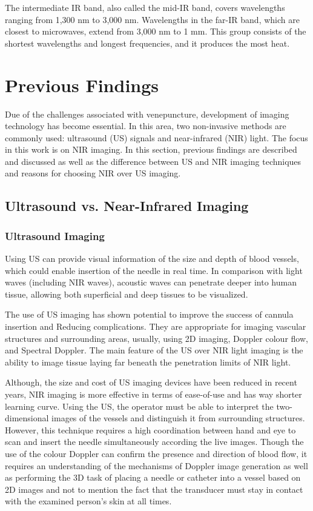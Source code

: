 The intermediate IR band, also called the mid-IR band, covers wavelengths ranging from 1,300 nm to 3,000 nm. 
Wavelengths in the far-IR band, which are closest to microwaves, extend from 3,000 nm to 1 mm. This group consists of the shortest wavelengths and longest frequencies, and it produces the most heat.


\section{Previous Findings}

Due of the challenges associated with venepuncture, development of imaging technology has become essential. In this area, two non-invasive methods are commonly used: ultrasound (US) signals and near-infrared (NIR) light. The focus in this work is on NIR imaging.
In this section, previous findings are described and discussed as well as the difference between US and NIR imaging techniques and reasons for choosing NIR over US imaging.

\subsection{Ultrasound vs. Near-Infrared Imaging}

\subsubsection{Ultrasound Imaging}
Using US can provide visual information of the size and depth of blood vessels, which could enable insertion of the needle in real time. In comparison with light waves (including NIR waves), acoustic waves can penetrate deeper into human tissue, allowing both superficial and deep tissues to be visualized. 

The use of US imaging has shown potential to improve the success of cannula insertion and Reducing complications. They are appropriate for imaging vascular structures and surrounding areas, usually, using 2D imaging, Doppler colour flow, and Spectral Doppler. The main feature of the US over NIR light imaging is the ability to image tissue laying far beneath the penetration limits of NIR light. 

Although, the size and cost of US imaging devices have been reduced in recent years, NIR imaging is more effective in terms of ease-of-use and has way shorter learning curve. Using the US, the operator must be able to interpret the two-dimensional images of the vessels and distinguish it from surrounding structures. However, this technique requires a high coordination between hand and eye to scan and insert the needle simultaneously according the live images. Though the use of the colour Doppler can confirm the presence and direction of blood flow, it requires an understanding of the mechanisms of Doppler image generation as well as performing the 3D task of placing a needle or catheter into a vessel based on 2D images and not to mention the fact that the transducer must stay in contact with the examined person’s skin at all times.

